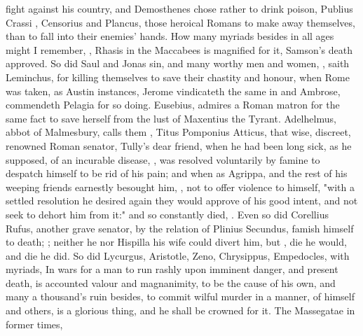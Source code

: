 fight against his country, and Demosthenes chose rather to drink poison,
Publius Crassi , Censorius and Plancus, those heroical Romans to
make away themselves, than to fall into their enemies' hands. How many myriads
besides in all ages might I remember, , \etc{} Rhasis in the Maccabees is magnified for it,
Samson's death approved. So did Saul and Jonas sin, and many worthy men and
women, , saith
Leminchus, for killing themselves to save their chastity
and honour, when Rome was taken, as Austin instances,  Jerome vindicateth the same in
 and Ambrose,  commendeth Pelagia for so doing. Eusebius,
 admires a Roman matron for the same
fact to save herself from the lust of Maxentius the Tyrant. Adelhelmus, abbot
of Malmesbury, calls them , \etc{} Titus Pomponius
Atticus, that wise, discreet, renowned Roman senator, Tully's dear friend, when
he had been long sick, as he supposed, of an incurable disease, , was resolved voluntarily by
famine to despatch himself to be rid of his pain; and when as Agrippa, and the
rest of his weeping friends earnestly besought him, , not to offer violence to himself,
"with a settled resolution he desired again they would approve of his good
intent, and not seek to dehort him from it:" and so constantly died,
. Even so did
Corellius Rufus, another grave senator, by the relation of Plinius Secundus,
 famish himself to death;
; neither he nor
Hispilla his wife could divert him, but ,
\etc{} die he would, and die he did. So did Lycurgus, Aristotle, Zeno,
Chrysippus, Empedocles, with myriads, \etc{} In wars for a man to run rashly
upon imminent danger, and present death, is accounted valour and magnanimity,
to be the cause of his own, and many a thousand's ruin
besides, to commit wilful murder in a manner, of himself and others, is a
glorious thing, and he shall be crowned for it. The
Massegatae in former times,
